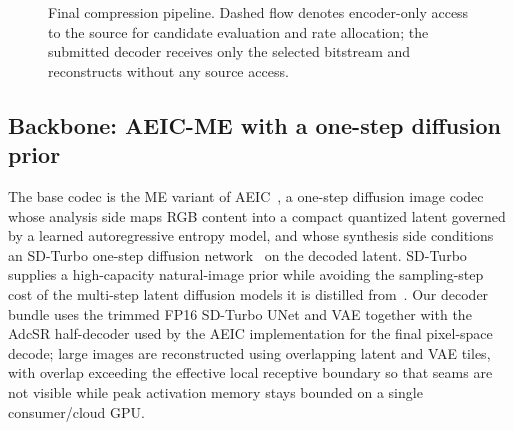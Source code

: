 \documentclass[runningheads]{llncs}
\begin{document}
\begin{figure}[t]
\centering
{}
\caption{Final compression pipeline. Dashed flow denotes encoder-only access to the source for candidate evaluation and rate allocation; the submitted decoder receives only the selected bitstream and reconstructs without any source access.}
\label{fig:pipeline}
\end{figure}

\subsection{Backbone: AEIC-ME with a one-step diffusion prior}
\label{sec:backbone}
The base codec is the ME variant of AEIC~\cite{zhang2026aeic}, a one-step diffusion image codec whose analysis side maps RGB content into a compact quantized latent governed by a learned autoregressive entropy model, and whose synthesis side conditions an SD-Turbo one-step diffusion network~\cite{sauer2023sdturbo} on the decoded latent. SD-Turbo supplies a high-capacity natural-image prior while avoiding the sampling-step cost of the multi-step latent diffusion models it is distilled from~\cite{rombach2022ldm}. Our decoder bundle uses the trimmed FP16 SD-Turbo UNet and VAE together with the AdcSR half-decoder used by the AEIC implementation for the final pixel-space decode; large images are reconstructed using overlapping latent and VAE tiles, with overlap exceeding the effective local receptive boundary so that seams are not visible while peak activation memory stays bounded on a single consumer/cloud GPU.
\end{document}
